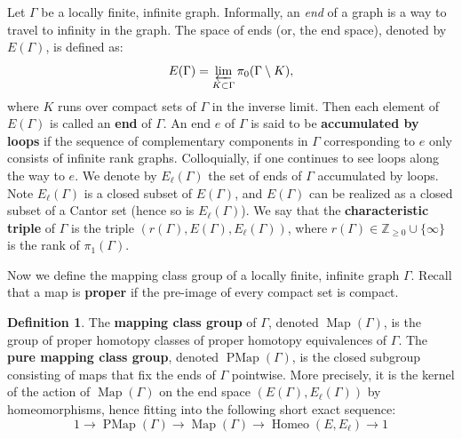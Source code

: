 \documentclass[11pt]{amsart}
\theoremstyle{plain}
\theoremstyle{definition}
\newtheorem{DEF}[THM]{Definition}
\DeclareMathOperator{\PMap}{PMap}
\DeclareMathOperator{\Homeo}{Homeo}
\DeclareMathOperator{\Map}{Map}
\newcommand{\Z}{\mathbb{Z}}
\def\G{{\Gamma}}
\newcommand{\<}{\langle}
\renewcommand{\>}{\rangle}
\newcommand{\longto}{\longrightarrow}
\begin{document}
Let $\G$ be a locally finite, infinite graph. 
Informally, an \emph{end} of a graph is a way to travel to infinity in the graph. The space of ends (or, the end space), denoted by $E(\G)$, is defined as:
\[
    E(\G) = \varprojlim_{K \subset \G}\pi_0(\G \setminus K),
\]
where $K$ runs over compact sets of $\G$ in the inverse limit. Then each element of $E(\G)$ is called an \textbf{end} of $\G$. An end $e$ of $\G$ is said to be \textbf{accumulated by loops}  if the sequence of complementary components in $\G$ corresponding to $e$ only consists of infinite rank graphs. Colloquially, if one continues to see loops along the way to $e$. We denote by $E_\ell(\G)$ the set of ends of $\G$ accumulated by loops. Note $E_\ell(\G)$ is a closed subset of $E(\G)$, and $E(\G)$ can be realized as a closed subset of a Cantor set (hence so is $E_\ell(\G)$). We say that the \textbf{characteristic triple} of $\G$ is the triple $(r(\G),E(\G),E_{\ell}(\G))$, where $r(\G) \in \Z_{\geq 0 } \cup \{\infty\}$ is the rank of $\pi_{1}(\G)$.

Now we define the mapping class group of a locally finite, infinite graph $\G$. Recall that a map is \textbf{proper} if the pre-image of every compact set is compact.
\begin{DEF} \cite{AB2021}
    The \textbf{mapping class group} of $\G$, denoted $\Map(\G)$, is the group of
    proper homotopy classes of proper homotopy equivalences of $\G$. The
    \textbf{pure mapping class group}, denoted $\PMap(\G)$, is the closed
    subgroup consisting of maps that fix the ends of $\G$ pointwise. More precisely,
    it is the kernel of the action of $\Map(\G)$ on the end space
    $(E(\G),E_\ell(\G))$ by homeomorphisms, hence fitting into the following short exact sequence:
    \[
      1 \longto \PMap(\G) \longto \Map(\G) \longto \Homeo(E,E_\ell) \longto 1
    \]
\end{DEF}
\end{document}
